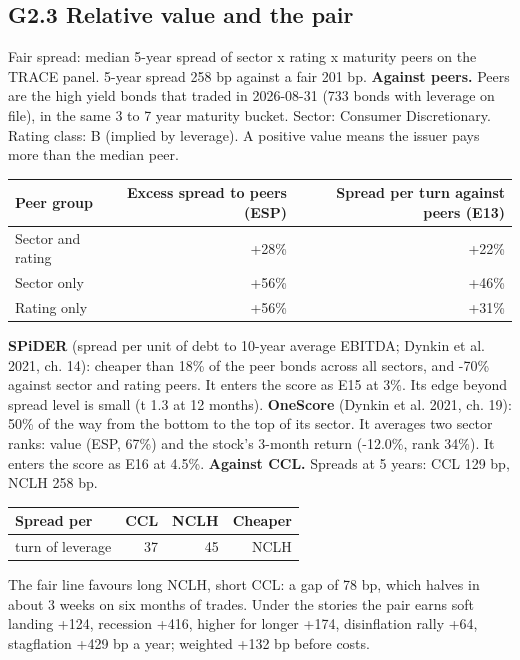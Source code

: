 \documentclass[11pt,a4paper]{article}
\begin{document}
\subsection*{G2.3 Relative value and the pair}
Fair spread: median 5-year spread of sector x rating x maturity peers on the TRACE panel. 5-year spread 258 bp against a fair 201 bp.
\textbf{Against peers.} Peers are the high yield bonds that traded in 2026-08-31 (733 bonds with leverage on file), in the same 3 to 7 year maturity bucket. Sector: Consumer Discretionary. Rating class: B (implied by leverage). A positive value means the issuer pays more than the median peer.
\begin{center}\footnotesize\setlength{\tabcolsep}{3.5pt}\begin{tabular}{@{}lrr@{}}\toprule
Peer group & Excess spread to peers (ESP) & Spread per turn against peers (E13) \\\midrule
Sector and rating & +28\% & +22\% \\
Sector only & +56\% & +46\% \\
Rating only & +56\% & +31\% \\
\bottomrule\end{tabular}\end{center}
\textbf{SPiDER} (spread per unit of debt to 10-year average EBITDA; Dynkin et al. 2021, ch. 14): cheaper than 18\% of the peer bonds across all sectors, and -70\% against sector and rating peers. It enters the score as E15 at 3\%. Its edge beyond spread level is small (t 1.3 at 12 months).
\textbf{OneScore} (Dynkin et al. 2021, ch. 19): 50\% of the way from the bottom to the top of its sector. It averages two sector ranks: value (ESP, 67\%) and the stock's 3-month return (-12.0\%, rank 34\%). It enters the score as E16 at 4.5\%.
\textbf{Against CCL.} Spreads at 5 years: CCL 129 bp, NCLH 258 bp.
\begin{center}\footnotesize\setlength{\tabcolsep}{3.5pt}\begin{tabular}{@{}lrrr@{}}\toprule
Spread per & CCL & NCLH & Cheaper \\\midrule
turn of leverage & 37 & 45 & NCLH \\
\bottomrule\end{tabular}\end{center}
The fair line favours long NCLH, short CCL: a gap of 78 bp, which halves in about 3 weeks on six months of trades. Under the stories the pair earns soft landing +124, recession +416, higher for longer +174, disinflation rally +64, stagflation +429 bp a year; weighted +132 bp before costs.
\end{document}
